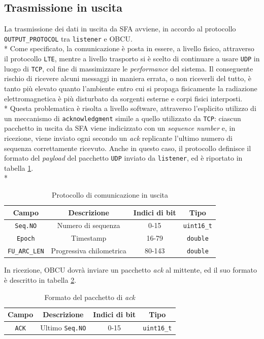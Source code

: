 \subsection{Trasmissione in uscita}
La trasmissione dei dati in uscita da SFA avviene, in accordo al protocollo \texttt{OUTPUT\_PROTOCOL} tra \texttt{listener} e OBCU.\\*
Come specificato, la comunicazione \`e posta in essere, a livello fisico, attraverso il protocollo \texttt{LTE}, mentre a livello trasporto si \`e scelto di continuare a usare \texttt{UDP} in luogo di \texttt{TCP}, col fine di massimizzare le \emph{performance} del sistema. Il conseguente rischio di ricevere alcuni messaggi in maniera errata, o non riceverli del tutto, \`e tanto pi\`u elevato quanto l'ambiente entro cui si propaga fisicamente la radiazione elettromagnetica \`e pi\`u disturbato da sorgenti esterne e corpi fisici interposti.\\*
Questa problematica \`e risolta a livello software, attraverso l'esplicito utilizzo di un meccanismo di \texttt{acknowledgment} simile a quello utilizzato da \texttt{TCP}: ciascun pacchetto in uscita da SFA viene indicizzato con un \emph{sequence number} e, in ricezione, viene inviato ogni secondo un \emph{ack} replicante l'ultimo numero di sequenza correttamente ricevuto.
Anche in questo caso, il protocollo definisce il formato del \emph{payload} del pacchetto \texttt{UDP} inviato da \texttt{listener}, ed \`e riportato in tabella \ref{tab:protoout}.\\*
\begin{table}[h]
	\centering
	\begin{tabular}{|c|c|c|c|}
		\hline 
		\textbf{Campo} & \textbf{Descrizione} & \textbf{Indici di bit} & \textbf{Tipo} \\ 
		\hline
		\texttt{Seq.NO} & Numero di sequenza & 0-15 & \texttt{uint16\_t} \\ 
		\hline 
		\texttt{Epoch} & Timestamp & 16-79 & \texttt{double} \\ 
		\hline 
		\texttt{FU\_ARC\_LEN} & Progressiva chilometrica & 80-143 & \texttt{double} \\ 
		\hline 
		
	\end{tabular} 
\caption{Protocollo di comunicazione in uscita}
\label{tab:protoout}
\end{table}
\clearpage
In ricezione, OBCU dovr\`a inviare un pacchetto \emph{ack} al mittente, ed il suo formato \`e descritto in tabella \ref{tab:ack}.
\begin{table}[h]
	\centering
	\begin{tabular}{|c|c|c|c|}
	\hline 
	\textbf{Campo} & \textbf{Descrizione} & \textbf{Indici di bit} & \textbf{Tipo} \\ 
	\hline
	\texttt{ACK} & Ultimo \texttt{Seq.NO} & 0-15 & \texttt{uint16\_t} \\ 
	\hline
\end{tabular}
\caption{Formato del pacchetto di \emph{ack}}
\label{tab:ack}
\end{table}
